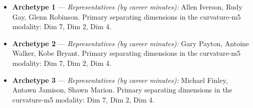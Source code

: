 \begin{itemize}
\item \textbf{Archetype 1} --- \emph{Representatives (by career minutes):} Allen Iverson, Rudy Gay, Glenn Robinson. Primary separating dimensions in the curvature-m5 modality: Dim 7, Dim 2, Dim 4.
\item \textbf{Archetype 2} --- \emph{Representatives (by career minutes):} Gary Payton, Antoine Walker, Kobe Bryant. Primary separating dimensions in the curvature-m5 modality: Dim 7, Dim 2, Dim 4.
\item \textbf{Archetype 3} --- \emph{Representatives (by career minutes):} Michael Finley, Antawn Jamison, Shawn Marion. Primary separating dimensions in the curvature-m5 modality: Dim 7, Dim 2, Dim 4.
\end{itemize}
